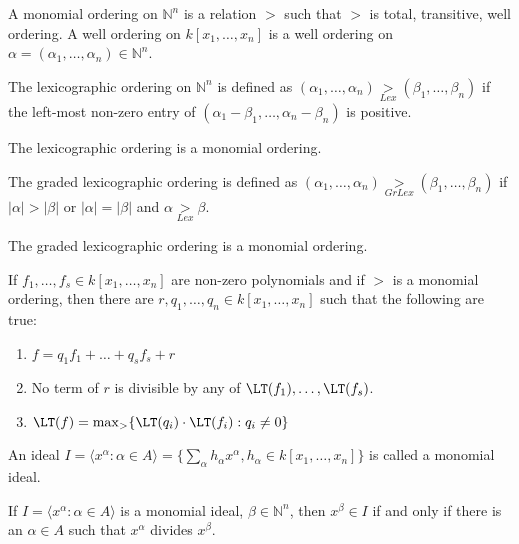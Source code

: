 \documentclass[crop=false,class=book]{standalone}
\begin{document}
\begin{definition}
A monomial ordering on $\mathbb{N}^n$ is a relation $>$ such that $>$ is total, transitive, well ordering. A well ordering on $k[x_1,\hdots ,x_n]$ is a well ordering on $\alpha = (\alpha_1,\hdots, \alpha_n) \in \mathbb{N}^n$.
\end{definition}
\begin{definition}
The lexicographic ordering on $\mathbb{N}^n$ is defined as $(\alpha_1,\hdots, \alpha_n) \underset{Lex}{>} (\beta_1,\hdots, \beta_n)$ if the left-most non-zero entry of $(\alpha_1-\beta_1,\hdots, \alpha_n-\beta_n)$ is positive.
\end{definition}
\begin{theorem}
The lexicographic ordering is a monomial ordering.
\end{theorem}
\begin{definition}
The graded lexicographic ordering is defined as $(\alpha_1,\hdots, \alpha_n) \underset{GrLex}{>}(\beta_1,\hdots, \beta_n)$ if $|\alpha|>|\beta|$ or $|\alpha| = |\beta|$ and $\alpha \underset{Lex}{>}\beta$.
\end{definition}
\begin{theorem}
The graded lexicographic ordering is a monomial ordering.
\end{theorem}
\begin{theorem}
If $f_1,\hdots, f_s\in k[x_1,\hdots ,x_n]$ are non-zero polynomials and if $>$ is a monomial ordering, then there are $r,q_1,\hdots, q_n\in k[x_1,\hdots ,x_n]$ such that the following are true:
\begin{enumerate}
\item $f=q_1f_1+\hdots + q_sf_s + r$
\item No term of $r$ is divisible by any of $\LT(f_1),\hdots, \LT(f_s)$.
\item $\LT(f) = \max_{>}\{\LT(q_i)\cdot \LT(f_i):q_i \ne 0\}$
\end{enumerate}
\end{theorem}
\begin{definition}
An ideal $I = \langle x^{\alpha}: \alpha \in A\rangle = \{\sum_{\alpha} h_{\alpha} x^\alpha, h_{\alpha} \in k[x_1,\hdots ,x_n]\}$ is called a monomial ideal.
\end{definition}
\begin{theorem}
If $I = \langle x^\alpha: \alpha \in A\rangle$ is a monomial ideal, $\beta \in \mathbb{N}^n$, then $x^\beta \in I$ if and only if there is an $\alpha \in A$ such that $x^\alpha$ divides $x^\beta$.
\end{theorem}
\end{document}
